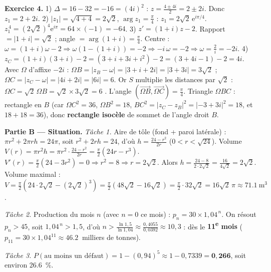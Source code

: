 \noindent\textbf{Exercice 4.}
1) $\Delta=16-32=-16=(4i)^2$ : $z=\frac{4\pm4i}{2}=2\pm2i$. Donc $z_1=2+2i$.
2) $|z_1|=\sqrt{4+4}=2\sqrt2$, $\arg z_1=\frac\pi4$ : $z_1=2\sqrt2\,\mathrm{e}^{i\pi/4}$.
$z_1^{\,4}=(2\sqrt2)^4\mathrm{e}^{i\pi}=64\times(-1)=-64$.
3) $z'=(1+i)z-2$. Rapport $=|1+i|=\sqrt2$ ; angle $=\arg(1+i)=\frac\pi4$.
Centre : $\omega=(1+i)\omega-2\Rightarrow\omega(1-(1+i))=-2\Rightarrow-i\,\omega=-2\Rightarrow\omega=\frac{2}{i}=-2i$.
4) $z_C=(1+i)(3+i)-2=(3+i+3i+i^2)-2=(3+4i-1)-2=4i$. Avec $\Omega$ d'affixe $-2i$ :
$\Omega B=|z_B-\omega|=|3+i+2i|=|3+3i|=3\sqrt2$ ; $\Omega C=|z_C-\omega|=|4i+2i|=|6i|=6$.
Or $S$ multiplie les distances par $\sqrt2$ : $\Omega C=\sqrt2\,\Omega B=\sqrt2\times3\sqrt2=6$ \checkmark.
L'angle $(\overrightarrow{\Omega B},\overrightarrow{\Omega C})=\frac\pi4$. Triangle $\Omega BC$ : rectangle en $B$
(car $\Omega C^2=36$, $\Omega B^2=18$, $BC^2=|z_C-z_B|^2=|{-3+3i}|^2=18$, et $18+18=36$),
donc \textbf{rectangle isocèle} de sommet de l'angle droit $B$.

\smallskip
\noindent\textbf{Partie B — Situation.}
\emph{Tâche 1.} Aire de tôle (fond + paroi latérale) : $\pi r^2+2\pi r h=24\pi$, soit $r^2+2rh=24$,
d'où $h=\frac{24-r^2}{2r}$ ($0<r<\sqrt{24}$). Volume $V(r)=\pi r^2h=\pi r^2\cdot\frac{24-r^2}{2r}=\frac\pi2(24r-r^3)$.
$V'(r)=\frac\pi2(24-3r^2)=0\Rightarrow r^2=8\Rightarrow r=2\sqrt2$. Alors $h=\frac{24-8}{2\cdot2\sqrt2}=\frac{16}{4\sqrt2}=2\sqrt2$.
Volume maximal : $V=\frac\pi2(24\cdot2\sqrt2-(2\sqrt2)^3)=\frac\pi2(48\sqrt2-16\sqrt2)=\frac\pi2\cdot32\sqrt2=16\sqrt2\,\pi\approx\SI{71,1}{\metre\cubed}$.

\emph{Tâche 2.} Production du mois $n$ (avec $n=0$ ce mois) : $p_n=30\times1{,}04^{\,n}$. On résout $p_n>45$,
soit $1{,}04^{\,n}>1{,}5$, d'où $n>\frac{\ln1{,}5}{\ln1{,}04}\approx\frac{0{,}4055}{0{,}0392}\approx10{,}3$ :
dès le \textbf{11\textsuperscript{e} mois} ($p_{11}=30\times1{,}04^{11}\approx\SI{46,2}{}$ milliers de tonnes).

\emph{Tâche 3.} $P(\text{au moins un défaut})=1-(0{,}94)^5\approx1-0{,}7339=\mathbf{0{,}266}$, soit environ \SI{26,6}{\percent}.
